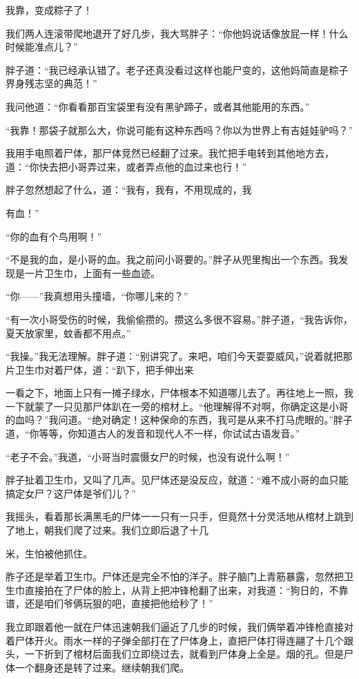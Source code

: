 我靠，变成粽子了！

我们两人连滚带爬地退开了好几步，我大骂胖子：“你他妈说话像放屁一样！什么时候能准点儿？”

胖子道：“我已经承认错了。老子还真没看过这样也能尸变的，这他妈简直是粽子界身残志坚的典范！”

我问他道：“你看看那百宝袋里有没有黑驴蹄子，或者其他能用的东西。”

“我靠！那袋子就那么大，你说可能有这种东西吗？你以为世界上有吉娃娃驴吗？”

我用手电照着尸体，那尸体竞然已经翻了过来。我忙把手电转到其他地方去，道：“你快去把小哥弄过来，或者弄点他的血过来也行！”

胖子忽然想起了什么，道：“我有，我有，不用现成的，我

有血！”

“你的血有个鸟用啊！”

“不是我的血，是小哥的血。我之前问小哥要的。”胖子从兜里掏出一个东西。我发现是一片卫生巾，上面有一些血迹。

“你——”我真想用头撞墙，“你哪儿来的？”

“有一次小哥受伤的时候，我偷偷攒的。攒这么多很不容易。”胖子道，“我告诉你，夏天放家里，蚊香都不用点。”

“我操。”我无法理解。胖子道：“别讲究了。来吧，咱们今天耍耍威风，”说着就把那片卫生巾对着尸体，道：“趴下，把手伸出来

一看之下，地面上只有一摊子绿水，尸体根本不知道哪儿去了。再往地上一照，我一下就蒙了一只见那尸体趴在一旁的棺材上。“他理解得不对啊，你确定这是小哥的血吗？”我问道。“绝对确定！这种保命的东西，我可是从来不打马虎眼的。”胖子道，“你等等，你知道古人的发音和现代人不一样，你试试古语发音。”

“老子不会。”我道，“小哥当时震慑女尸的时候，也没有说什么啊！”

胖子扯着卫生巾，又叫了几声。见尸体还是没反应，就道：“难不成小哥的血只能搞定女尸？这尸体是爷们儿？”

我摇头，看着那长满黑毛的尸体一一只有一只手，但竟然十分灵活地从棺材上跳到了地上，朝我们爬了过来。我们立即后退了十几

米，生怕被他抓住。

胙子还是举着卫生巾。尸体还是完全不怕的洋子。胖子脑门上青筋暴露，忽然把卫生巾直接拍在了尸体的脸上，从背上把冲锋枪翻了出来，对我道：“狗日的，不靠谱，还是咱们爷俩玩狠的吧，直接把他给秒了！”

我立即跟着他一就在尸体迅速朝我们逼近了几步的时候，我们俩举着冲锋枪直接对着尸体开火。雨水一样的子弹全部打在了尸体身上，直把尸体打得连翮了十几个跟头，一下折到了棺材后面我们立即绕过去，就看到尸体身上全是。烟的孔。但是尸体一个翻身还是转了过来。继续朝我们爬。

